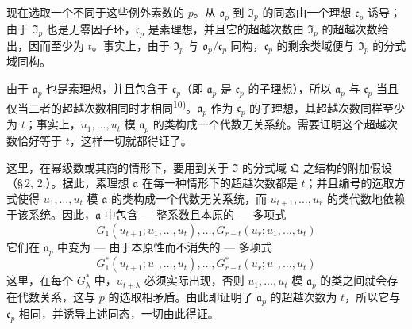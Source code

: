 现在选取一个不同于这些例外素数的 $p$。从 $\mathfrak{o}_p$ 到 $\mathfrak{I}_p$ 的同态由一个理想 $\mathfrak{c}_p$ 诱导；由于 $\mathfrak{I}_p$ 也是无零因子环，$\mathfrak{c}_p$ 是素理想，并且它的超越次数由 $\mathfrak{I}_p$ 的超越次数给出，因而至少为 $t$。事实上，由于 $\mathfrak{I}_p$ 与 $\mathfrak{o}_p/\mathfrak{c}_p$ 同构，$\mathfrak{c}_p$ 的剩余类域便与 $\mathfrak{I}_p$ 的分式域同构。

由于 $\mathfrak{a}_p$ 也是素理想，并且包含于 $\mathfrak{c}_p$（即 $\mathfrak{a}_p$ 是 $\mathfrak{c}_p$ 的子理想），所以 $\mathfrak{a}_p$ 与 $\mathfrak{c}_p$ 当且仅当二者的超越次数相同时才相同\textsuperscript{10)}。$\mathfrak{a}_p$ 作为 $\mathfrak{c}_p$ 的子理想，其超越次数同样至少为 $t$；事实上，$u_1,\ldots,u_t$ 模 $\mathfrak{a}_p$ 的类构成一个代数无关系统。需要证明这个超越次数恰好等于 $t$，这样一切就都得证了。

这里，在幂级数或其商的情形下，要用到关于 $\mathfrak{I}$ 的分式域 $\mathfrak{Q}$ 之结构的附加假设（\S\,2, 2.）。据此，素理想 $\mathfrak{a}$ 在每一种情形下的超越次数都是 $t$；并且编号的选取方式使得 $u_1,\ldots,u_t$ 模 $\mathfrak{a}$ 的类构成一个代数无关系统，而 $u_{t+1},\ldots,u_r$ 的类代数地依赖于该系统。因此，$\mathfrak{a}$ 中包含 --- 整系数且本原的 --- 多项式
\[
G_1(u_{t+1};u_1,\ldots,u_t),\ldots,G_{r-t}(u_r;u_1,\ldots,u_t)\tag{1}
\]
它们在 $\mathfrak{a}_p$ 中变为 --- 由于本原性而不消失的 --- 多项式
\[
G^*_1(u_{t+1};u_1,\ldots,u_t),\ldots,G^*_{r-t}(u_r;u_1,\ldots,u_t)\tag{2}
\]
这里，在每个 $G^*_\lambda$ 中，$u_{t+\lambda}$ 必须实际出现，否则 $u_1,\ldots,u_t$ 模 $\mathfrak{a}_p$ 的类之间就会存在代数关系，这与 $p$ 的选取相矛盾。由此即证明了 $\mathfrak{a}_p$ 的超越次数为 $t$，所以它与 $\mathfrak{c}_p$ 相同，并诱导上述同态，一切由此得证。

